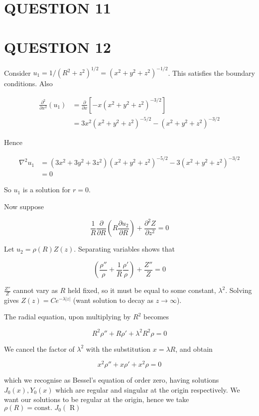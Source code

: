 \documentclass[a4paper]{article}
\begin{document}
\section{QUESTION 11}

\section{QUESTION 12}

Consider $ u_{1} = 1/(R^{2} + z^{2})^{1/2} = (x^{2} + y^{2} + z^{2})^{-1/2} $.
This satisfies the boundary conditions. Also


\begin{align*}
\frac{\partial^{2} }{\partial x^{2}} (u_{1}) & = \frac{\partial }{\partial x} \left[ - x (x^{2} + y^{2} + z^{2})^{-3/2}   \right]  \\
& = 3x^{2} (x^{2} + y^{2} + z^{2})^{-5/2} - (x^{2} + y^{2} + z^{2})^{-3/2} 
\end{align*}

Hence 

\begin{align*}
\nabla^{2} u_{1} & = (3x^{2} + 3y^{2} + 3z^{2})(x^{2} + y^{2} + z^{2})^{-5/2} - 3 (x^{2} + y^{2} + z^{2})^{-3/2} \\
& = 0
\end{align*}

So $ u_{1} $ is a solution for $ r = 0 $.

Now suppose 

\[ \frac{1}{R} \frac{\partial }{\partial R} \left(  R \frac{\partial u_{2} }{\partial R} \right) + \frac{\partial^{2} Z }{\partial z^{2}}  = 0\]

Let $ u_{2} = \rho(R)Z(z) $.  Separating variables shows that

\[ \left(  \frac{\rho''}{\rho} + \frac{1}{R} \frac{\rho'}{\rho} \right) + \frac{Z''}{Z} = 0  \]

$ \frac{Z''}{Z} $ cannot vary as $ R $ held fixed, so it must be equal to some constant, $ \lambda^{2} $. Solving gives $ Z(z) = C e^{-\lambda| z |} $ (want solution to decay as $ z \to \infty $).

The radial equation, upon multiplying by $ R^{2} $ becomes

\[ R^{2} \rho'' + R \rho' + \lambda^{2} R^{2}  \rho = 0 \]

We cancel the factor of $ \lambda^{2} $ with the substitution $ x = \lambda R  $, and obtain 

\[ x^{2} \rho'' + x \rho' + x^{2} \rho = 0 \]

which we recognise as Bessel's equation of order zero, having solutions $ J_{0}(x), Y_{0}(x) $ which are regular and singular at the origin respectively. We want our solutions to be regular at the origin, hence we take $ \rho(R) = \text{const. }J_{0}(\text{ R}) $
\end{document}
